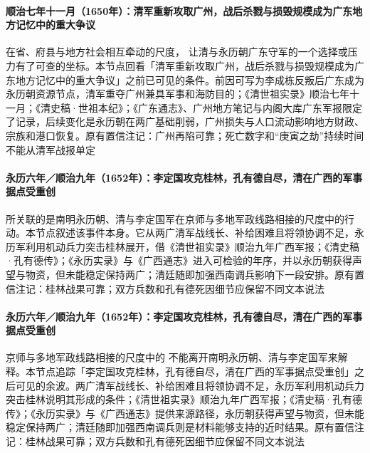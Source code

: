 \paragraph{顺治七年十一月（1650年）：清军重新攻取广州，战后杀戮与损毁规模成为广东地方记忆中的重大争议}
在省、府县与地方社会相互牵动的尺度， 让清与永历朝广东守军的一个选择或压力有了可查的坐标。本节点回看「清军重新攻取广州，战后杀戮与损毁规模成为广东地方记忆中的重大争议」之前已可见的条件。前因可写为李成栋反叛后广东成为永历朝资源节点，清军重夺广州兼具军事和海防目的；《清世祖实录》顺治七年十一月；《清史稿·世祖本纪》；《广东通志》、广州地方笔记与内阁大库广东军报限定了记录，后续变化是永历朝在两广基础削弱，广州损失与人口流动影响地方财政、宗族和港口恢复。原有置信注记：广州再陷可靠；死亡数字和“庚寅之劫”持续时间不能从清军战报单定

\paragraph{永历六年／顺治九年（1652年）：李定国攻克桂林，孔有德自尽，清在广西的军事据点受重创}
 所关联的是南明永历朝、清与李定国军在京师与多地军政线路相接的尺度中的行动。本节点叙述该事件本身。它从两广清军战线长、补给困难且将领协调不足，永历军利用机动兵力突击桂林展开，借《清世祖实录》顺治九年广西军报；《清史稿·孔有德传》；《永历实录》与《广西通志》进入可检验的年序，并以永历朝获得声望与物资，但未能稳定保持两广；清廷随即加强西南调兵影响下一段安排。原有置信注记：桂林战果可靠；双方兵数和孔有德死因细节应保留不同文本说法

\paragraph{永历六年／顺治九年（1652年）：李定国攻克桂林，孔有德自尽，清在广西的军事据点受重创}
京师与多地军政线路相接的尺度中的 不能离开南明永历朝、清与李定国军来解释。本节点追踪「李定国攻克桂林，孔有德自尽，清在广西的军事据点受重创」之后可见的余波。两广清军战线长、补给困难且将领协调不足，永历军利用机动兵力突击桂林说明其形成的条件；《清世祖实录》顺治九年广西军报；《清史稿·孔有德传》；《永历实录》与《广西通志》提供来源路径，永历朝获得声望与物资，但未能稳定保持两广；清廷随即加强西南调兵则是材料能够支持的近时结果。原有置信注记：桂林战果可靠；双方兵数和孔有德死因细节应保留不同文本说法

